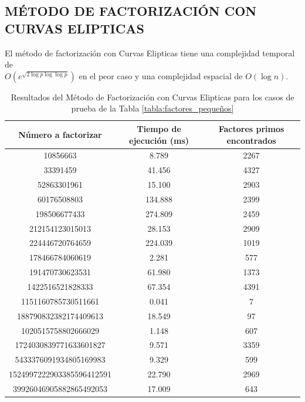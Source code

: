     \subsection{MÉTODO DE FACTORIZACIÓN CON CURVAS ELIPTICAS}
    El método de factorización con Curvas Elipticas tiene una complejidad temporal de \\ $O(e^{\sqrt{2 \log p \log \log p}})$ en el peor caso y una complejidad espacial de $O(\log n)$.

    \begin{table}[H]
        \centering
        \begin{tabular}{ccc}
        \toprule
        Número a factorizar & Tiempo de ejecución (ms) & Factores primos encontrados\\
        \midrule
        10856663 & 8.789 & 2267\\
        33391459 & 41.456 & 4327\\
        52863301961 & 15.100 & 2903\\
        60176508803 & 134.888 & 2399\\
        198506677433 & 274.809 & 2459\\
        212154123015013 & 28.153 & 2909\\
        224446720764659 & 224.039 & 1019\\
        178466784060619 & 2.281 & 577\\
        191470730623531 & 61.980 & 1373\\
        1422516521828333 & 67.354 & 4391\\
        1151160785730511661 & 0.041 & 7\\
        188790832382174409613 & 18.549 & 97\\
        1020515758802666029 & 1.148 & 607\\
        1724030839771633601827 & 9.571 & 3359\\
        5433376091934805169983 & 9.329 & 599\\
        1524997222903385596412591 & 22.790 & 2969\\
        39926046905882865492053 & 17.009 & 643\\

        \bottomrule
        \end{tabular}
        \caption{Resultados del Método de Factorización con Curvas Elipticas para los casos de prueba de la Tabla \ref{tabla:factores_pequeños}}
        \label{tab:res-eliptic-pequeños}
    \end{table}

